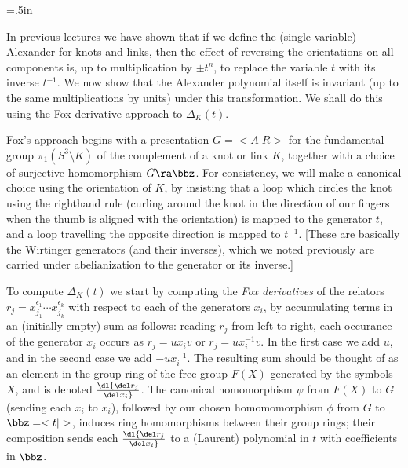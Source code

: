 \voffset=.5in


\loadmsbm

\dl{\displaystyle}
\ctln{\centerline}
\ssk{\smallskip}
\msk{\medskip}
\bsk{\bigskip}
\ubr{\underbar}
\lra{$\Leftrightarrow$}
\ra{\rightarrow}
\vskt{\vskip-10pt}
\del{\partial}

\overfullrule=0pt
\parindent=0pt
\parskip=10pt





\ssk


\bsk

In previous lectures we have shown that if we define the (single-variable) Alexander
for  knots and links, then the effect of reversing the
orientations on all components is, up to multiplication by $\pm t^n$, to replace
the variable $t$ with its inverse $t^{-1}$. We now show that the Alexander polynomial 
itself is invariant (up to the same multiplications by units) under this
transformation. We shall do this using the Fox derivative approach to $\Delta_K(t)$.

\msk

Fox's approach begins with a presentation $G=<A|R>$ for the fundamental group 
$\pi_1(S^3\setminus K)$ of the complement of a knot or link $K$, together
with a choice of surjective homomorphism $G\ra\bbz$. For consistency, we will
make a canonical choice using the orientation of $K$, by insisting that a loop
which circles the knot using the righthand rule (curling around the knot
in the direction of our fingers when the thumb is aligned with the orientation)
is mapped to the generator $t$, and a loop travelling the opposite direction 
is mapped to $t^{-1}$. [These are basically the Wirtinger generators (and their
inverses), which we noted previously are carried under abelianization to the
generator or its inverse.]

\ssk

To compute $\Delta_K(t)$ we start by computing the {\it Fox derivatives} of
the relators $r_j=x_{j_1}^{\epsilon_1}\cdots x_{j_k}^{\epsilon_k}$ with 
respect to each of the generators $x_i$, by accumulating terms in an 
(initially empty) sum as follows: reading $r_j$ from left
to right, each occurance of the generator $x_i$ occurs as
$r_j=ux_iv$ or $r_j=ux_i^{-1}v$. In the first case we add $u$, and in the 
second case we add $-ux_i^{-1}$. The resulting sum should be thought of
as an element in the group ring of the free group $F(X)$ generated by
the symbols $X$, and is denoted $\dl {{\del r_j}\over{\del x_i}}$. 
The canonical homomorphism $\psi$ from $F(X)$ to $G$ (sending each $x_i$ to $x_i$),
followed by our chosen homomomorphism $\phi$ from $G$ to $\bbz=<t|>$, induces ring
homomorphisms between their group rings; their composition sends each
$\dl {{\del r_j}\over{\del x_i}}$ to a (Laurent) polynomial in $t$ with
coefficients in $\bbz$. 

